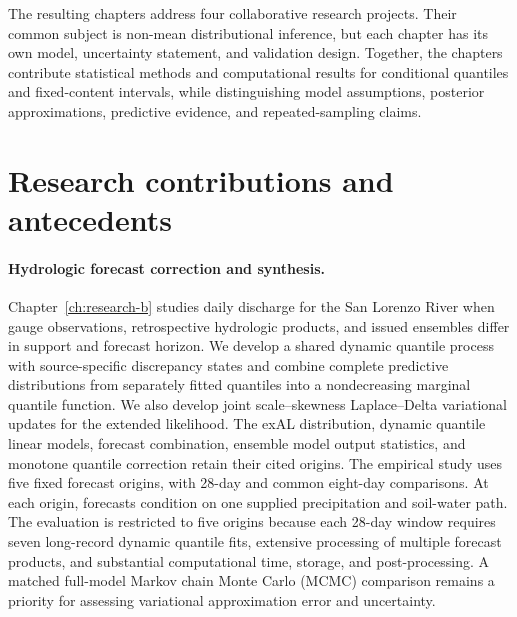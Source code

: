 The resulting chapters address four collaborative research projects. Their
common subject is non-mean distributional inference, but each chapter has its
own model, uncertainty statement, and validation design. Together, the chapters
contribute statistical methods and computational results for conditional
quantiles and fixed-content intervals, while distinguishing model assumptions,
posterior approximations, predictive evidence, and repeated-sampling claims.

\section{Research contributions and antecedents}
\label{sec:intro-contributions}

\paragraph{Hydrologic forecast correction and synthesis.}
Chapter~\ref{ch:research-b} studies daily discharge for the San Lorenzo River
when gauge observations, retrospective hydrologic products, and issued
ensembles differ in support and forecast horizon. We develop a shared
dynamic quantile process with source-specific discrepancy states and combine
complete predictive distributions from separately fitted quantiles into a
nondecreasing marginal quantile function. We also develop joint
scale--skewness Laplace--Delta variational updates for the extended likelihood.
The exAL distribution, dynamic quantile linear models, forecast combination,
ensemble model output statistics, and monotone quantile correction retain
their cited origins. The empirical study uses five fixed forecast origins,
with 28-day and common eight-day comparisons. At each origin, forecasts
condition on one supplied precipitation and soil-water path. The evaluation is
restricted to five origins because each 28-day window requires seven
long-record dynamic quantile fits, extensive processing of multiple forecast
products, and substantial computational time, storage, and post-processing.
A matched full-model Markov chain Monte Carlo (MCMC) comparison remains a
priority for assessing variational approximation error and uncertainty.

